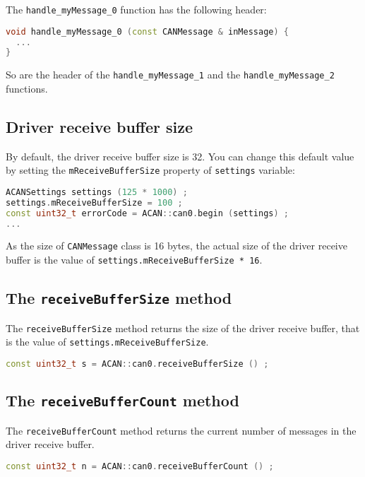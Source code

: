 \documentclass[10pt, a4paper, obeyspaces, openany]{extarticle}
\newcommand \subsectionLabel[2]{\subsection{#1}\label{subsec:#2}}
\begin{document}
The \texttt{handle\_myMessage\_0} function has the following header:

{ \small\begin{lstlisting}[language=c++]
void handle_myMessage_0 (const CANMessage & inMessage) {
  ...
}
\end{lstlisting}}

So are the header of the \texttt{handle\_myMessage\_1} and the \texttt{handle\_myMessage\_2} functions.




\subsectionLabel{Driver receive buffer size}{driverReceiveBufferSize}

By default, the driver receive buffer size is 32.  You can change this default value by setting the \texttt{mReceiveBufferSize} property of \texttt{settings} variable:

{ \small\begin{lstlisting}[language=c++]
ACANSettings settings (125 * 1000) ;
settings.mReceiveBufferSize = 100 ;
const uint32_t errorCode = ACAN::can0.begin (settings) ;
...
\end{lstlisting}}

As the size of \texttt{CANMessage} class is 16 bytes, the actual size of the driver receive buffer is the value of \texttt{settings.mReceiveBufferSize * 16}.


\subsection{The \texttt{receiveBufferSize} method}

The \texttt{receiveBufferSize} method returns the size of the driver receive buffer, that is the value of \texttt{settings.mReceiveBufferSize}.
{ \small\begin{lstlisting}[language=c++]
const uint32_t s = ACAN::can0.receiveBufferSize () ;
\end{lstlisting}}


\subsection{The \texttt{receiveBufferCount} method}

The \texttt{receiveBufferCount} method returns the current number of messages in the driver receive buffer.
{ \small\begin{lstlisting}[language=c++]
const uint32_t n = ACAN::can0.receiveBufferCount () ;
\end{lstlisting}}
\end{document}
